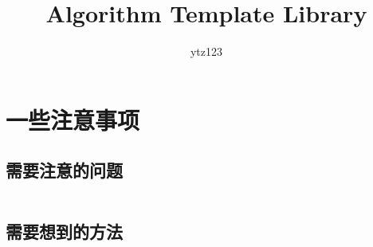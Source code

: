 \documentclass{article}
\author{ytz123}
\title{Algorithm Template Library}
\begin{document}
 
\maketitle %
\newpage %
\tableofcontents %
\newpage
\section{一些注意事项} %
\subsection{需要注意的问题} %
\inputminted[breaklines]{text}{../注意事项/需要注意的问题.txt} %

\subsection{需要想到的方法} %
\inputminted[breaklines]{text}{../注意事项/需要想到的方法.txt} %





\end{document}
